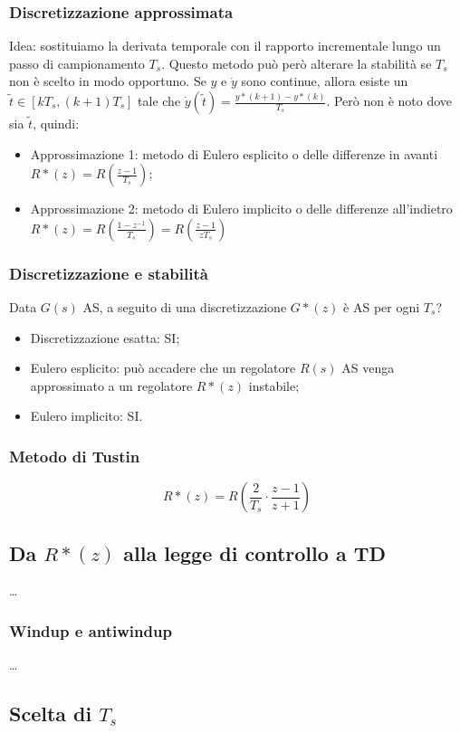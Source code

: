     \subsubsection{Discretizzazione approssimata}
    Idea: sostituiamo la derivata temporale con il rapporto incrementale lungo un passo di campionamento $T_s$.\newline
    Questo metodo può però alterare la stabilità se $T_s$ non è scelto in modo opportuno.\newline
    \newline
    Se $y$ e $\dot{y}$ sono continue, allora esiste un $\tilde{t} \in [kT_s, (k+1) T_s]$ tale che $\dot{y}(\tilde{t}) = \frac{y*(k+1) - y*(k)}{T_s}$.\newline
    Però non è noto dove sia $\tilde{t}$, quindi:
    \begin{itemize}
        \item Approssimazione 1: metodo di Eulero esplicito o delle differenze in avanti $R*(z) = R\left(\frac{z-1}{T_s}\right)$;
        \item Approssimazione 2: metodo di Eulero implicito o delle differenze all'indietro $R*(z) = R\left(\frac{1-z^{-1}}{T_s}\right) = R\left(\frac{z-1}{z T_s}\right)$
    \end{itemize}
    \subsubsection{Discretizzazione e stabilità}
    Data $G(s)$ AS, a seguito di una discretizzazione $G*(z)$ è AS per ogni $T_s$?
    \begin{itemize}
        \item Discretizzazione esatta: SI;
        \item Eulero esplicito: può accadere che un regolatore $R(s)$ AS venga approssimato a un regolatore $R*(z)$ instabile;
        \item Eulero implicito: SI.
    \end{itemize}
    \subsubsection{Metodo di Tustin}
    \[
        R*(z) = R( \frac{2}{T_s} \cdot \frac{z-1}{z+1})
    \]
    \subsection{Da $R*(z)$ alla legge di controllo a TD}
    \dots
    \subsubsection{Windup e antiwindup}
    \dots
    \subsection{Scelta di $T_s$}
